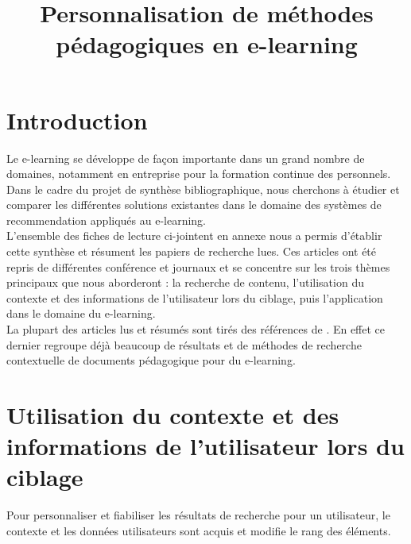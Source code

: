 \documentclass[conference]{./sty/IEEEtran}
\begin{document}
\title{Personnalisation de méthodes pédagogiques en e-learning}


\author{
}

\maketitle

\tableofcontents

\section{Introduction}

Le e-learning se développe de façon importante dans un grand nombre de
domaines, notamment en entreprise pour la formation continue des personnels.
Dans le cadre du projet de synthèse bibliographique, nous cherchons à étudier
et comparer les différentes solutions existantes dans le domaine des systèmes
de recommendation appliqués au e-learning. \\

L'ensemble des fiches de lecture ci-jointent en annexe nous a permis d'établir
cette synthèse et résument les papiers de recherche lues. Ces articles ont été
repris de différentes conférence et journaux et se concentre sur les trois
thèmes principaux que nous aborderont : la recherche de contenu, l'utilisation
du contexte et des informations de l'utilisateur lors du ciblage, puis
l'application dans le domaine du e-learning. \\

La plupart des articles lus et résumés sont tirés des références de
\cite{DBLP:journals/tlt/VerbertMOWDBD12}. En effet ce dernier regroupe déjà
beaucoup de résultats et de méthodes de recherche contextuelle de documents
pédagogique pour du e-learning. \\



\section{Utilisation du contexte et des informations de l'utilisateur lors du ciblage}

Pour personnaliser et fiabiliser les résultats de recherche pour un
utilisateur, le contexte et les données utilisateurs sont acquis et modifie le
rang des éléments. \\
\end{document}
